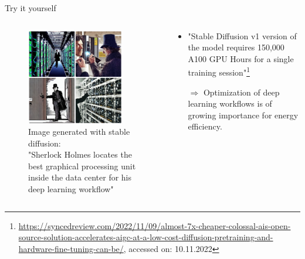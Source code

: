 \documentclass[compress,aspectratio=169]{beamer}
\begin{document}
\begin{frame}{Try it yourself}
\label{pg:lastpage} %

\begin{columns}
        \begin{column}{0.5\textwidth}
            \centering
            \vspace{-1em}
            \begin{figure}
            \includegraphics[width=0.85\textwidth]{assets/Sherlock-Holmes-locates-the-best-graphical-processing-unit-inside-the-data-center-for-his-deep-learning-workflow}
            \caption*{Image generated with stable diffusion: \\
            \tiny{"Sherlock Holmes locates the best graphical processing unit inside the data center for his deep learning workflow"}}
            \end{figure}
        \end{column}
        \begin{column}{0.5\textwidth}
            \begin{itemize}
                \item "Stable Diffusion v1 version of the model requires 150,000 A100 GPU Hours for a single training session"\footnote{\tiny{\url{https://syncedreview.com/2022/11/09/almost-7x-cheaper-colossal-ais-open-source-solution-accelerates-aigc-at-a-low-cost-diffusion-pretraining-and-hardware-fine-tuning-can-be/}}, accessed on: 10.11.2022}
                \vspace{1em}
                \item[$\Rightarrow$] Optimization of deep learning workflows is of growing importance for energy efficiency.
            \end{itemize}
        \end{column}
    \end{columns}

\end{frame}
\end{document}
